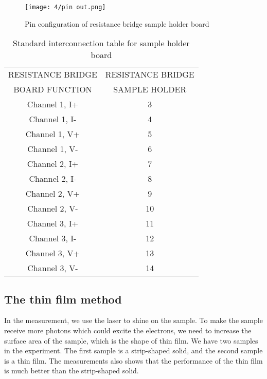 \documentclass{article}
\begin{document}
\begin{figure}[H]
                \centering
                \texttt{[image: 4/pin out.png]}
                \caption{Pin configuration of resistance bridge sample holder board}
                \label{pin out}
            \end{figure}
            \begin{table}[H]
                \centering
                \begin{tabular}{|c|c|}
                \hline
                   RESISTANCE BRIDGE & RESISTANCE BRIDGE\\
                   BOARD FUNCTION & SAMPLE HOLDER\\
                   \hline
                   Channel 1, I+ & 3    \\  \hline
                   Channel 1, I- & 4    \\  \hline
                   Channel 1, V+ & 5    \\  \hline
                   Channel 1, V- & 6    \\  \hline
                   Channel 2, I+ & 7    \\  \hline
                   Channel 2, I- & 8    \\  \hline
                   Channel 2, V+ & 9    \\  \hline
                   Channel 2, V- & 10   \\  \hline
                   Channel 3, I+ & 11   \\  \hline
                   Channel 3, I- & 12   \\  \hline
                   Channel 3, V+ & 13   \\  \hline
                   Channel 3, V- & 14   \\  \hline
                \end{tabular}
                \caption{Standard interconnection table for sample holder board}
                \label{interconn}
            \end{table}
\subsection{The thin film method}
In the measurement, we use the laser to shine on the sample. To make the sample receive more photons which could excite the electrons, we need to increase the surface area of the sample, which is the shape of thin film. We have two samples in the experiment. The first sample is a strip-shaped solid, and the second sample is a thin film. The measurements also shows that the performance of the thin film is much better than the strip-shaped solid.
\end{document}
